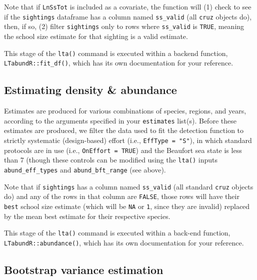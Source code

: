 \documentclass[
]{book}
\begin{document}
Note that if \texttt{LnSsTot} is included as a covariate, the function will (1) check to see if the \texttt{sightings} dataframe has a column named \texttt{ss\_valid} (all \texttt{cruz} objects do), then, if so, (2) filter \texttt{sightings} only to rows where \texttt{ss\_valid} is \texttt{TRUE}, meaning the school size estimate for that sighting is a valid estimate.

This stage of the \texttt{lta()} command is executed within a backend function, \texttt{LTabundR::fit\_df()}, which has its own documentation for your reference.

\hypertarget{estimating-density-abundance}{%
\subsection*{Estimating density \& abundance}\label{estimating-density-abundance}}

Estimates are produced for various combinations of species, regions, and years, according to the arguments specified in your \texttt{estimates} list(s). Before these estimates are produced, we filter the data used to fit the detection function to strictly systematic (design-based) effort (i.e., \texttt{EffType\ =\ "S"}), in which standard protocols are in use (i.e., \texttt{OnEffort\ =\ TRUE}) and the Beaufort sea state is less than 7 (though these controls can be modified using the \texttt{lta()} inputs \texttt{abund\_eff\_types} and \texttt{abund\_bft\_range} (see above).

Note that if \texttt{sightings} has a column named \texttt{ss\_valid} (all standard \texttt{cruz} objects do) and any of the rows in that column are \texttt{FALSE}, those rows will have their \texttt{best} school size estimate (which will be \texttt{NA} or \texttt{1}, since they are invalid) replaced by the mean best estimate for their respective species.

This stage of the \texttt{lta()} command is executed within a back-end function, \texttt{LTabundR::abundance()}, which has its own documentation for your reference.

\hypertarget{bootstrap-variance-estimation}{%
\subsection*{Bootstrap variance estimation}\label{bootstrap-variance-estimation}}
\end{document}

